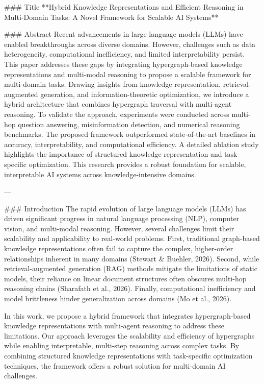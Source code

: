 ### Title
**Hybrid Knowledge Representations and Efficient Reasoning in Multi-Domain Tasks: A Novel Framework for Scalable AI Systems**

### Abstract
Recent advancements in large language models (LLMs) have enabled breakthroughs across diverse domains. However, challenges such as data heterogeneity, computational inefficiency, and limited interpretability persist. This paper addresses these gaps by integrating hypergraph-based knowledge representations and multi-modal reasoning to propose a scalable framework for multi-domain tasks. Drawing insights from knowledge representation, retrieval-augmented generation, and information-theoretic optimization, we introduce a hybrid architecture that combines hypergraph traversal with multi-agent reasoning. To validate the approach, experiments were conducted across multi-hop question answering, misinformation detection, and numerical reasoning benchmarks. The proposed framework outperformed state-of-the-art baselines in accuracy, interpretability, and computational efficiency. A detailed ablation study highlights the importance of structured knowledge representation and task-specific optimization. This research provides a robust foundation for scalable, interpretable AI systems across knowledge-intensive domains.

---

### Introduction
The rapid evolution of large language models (LLMs) has driven significant progress in natural language processing (NLP), computer vision, and multi-modal reasoning. However, several challenges limit their scalability and applicability to real-world problems. First, traditional graph-based knowledge representations often fail to capture the complex, higher-order relationships inherent in many domains (Stewart & Buehler, 2026). Second, while retrieval-augmented generation (RAG) methods mitigate the limitations of static models, their reliance on linear document structures often obscures multi-hop reasoning chains (Sharafath et al., 2026). Finally, computational inefficiency and model brittleness hinder generalization across domains (Mo et al., 2026).

In this work, we propose a hybrid framework that integrates hypergraph-based knowledge representations with multi-agent reasoning to address these limitations. Our approach leverages the scalability and efficiency of hypergraphs while enabling interpretable, multi-step reasoning across complex tasks. By combining structured knowledge representations with task-specific optimization techniques, the framework offers a robust solution for multi-domain AI challenges.


